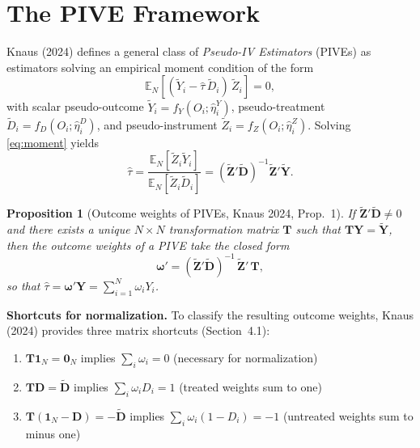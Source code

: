 \documentclass[12pt, a4paper]{article}
\theoremstyle{condstyle}
\theoremstyle{plain}
\newtheorem{proposition}{Proposition}[section]
\newcommand{\EN}{\mathbb{E}_N}
\newcommand{\bone}{\mathbf{1}_N}
\newcommand{\bzero}{\mathbf{0}_N}
\newcommand{\tY}{\tilde{Y}}
\newcommand{\tD}{\tilde{D}}
\newcommand{\tZ}{\tilde{Z}}
\begin{document}
\section{The PIVE Framework}
\label{sec:pive}

Knaus (2024) defines a general class of \emph{Pseudo-IV Estimators} (PIVEs)
as estimators solving an empirical moment condition of the form
\begin{equation}
  \EN\!\left[(\tY_i - \hat\tau\,\tD_i)\,\tZ_i\right] = 0,
  \label{eq:moment}
\end{equation}
with scalar pseudo-outcome $\tY_i = f_Y(O_i;\hat\eta^Y_i)$,
pseudo-treatment $\tD_i = f_D(O_i;\hat\eta^D_i)$,
and pseudo-instrument $\tZ_i = f_Z(O_i;\hat\eta^Z_i)$.
Solving \eqref{eq:moment} yields
\begin{equation}
  \hat\tau = \frac{\EN[\tZ_i\tY_i]}{\EN[\tZ_i\tD_i]}
            = (\tilde{\mathbf{Z}}'\tilde{\mathbf{D}})^{-1}\tilde{\mathbf{Z}}'\tilde{\mathbf{Y}}.
  \label{eq:pive_sol}
\end{equation}

\begin{proposition}[Outcome weights of PIVEs, Knaus 2024, Prop.~1]
\label{prop:weights}
If $\tilde{\mathbf{Z}}'\tilde{\mathbf{D}} \neq 0$ and there exists a unique $N\times N$
transformation matrix $\mathbf{T}$ such that $\mathbf{T}\mathbf{Y} = \tilde{\mathbf{Y}}$,
then the outcome weights of a PIVE take the closed form
\begin{equation}
  \boldsymbol{\omega}' = (\tilde{\mathbf{Z}}'\tilde{\mathbf{D}})^{-1}\,\tilde{\mathbf{Z}}'\,\mathbf{T},
  \label{eq:weights_general}
\end{equation}
so that $\hat\tau = \boldsymbol{\omega}'\mathbf{Y} = \sum_{i=1}^N \omega_i Y_i$.
\end{proposition}

\medskip
\noindent\textbf{Shortcuts for normalization.}
To classify the resulting outcome weights,
Knaus (2024) provides three matrix shortcuts (Section~4.1):

\begin{enumerate}[label=\textbf{SC\arabic*.}]
  \item $\mathbf{T}\bone = \bzero$ implies $\sum_i \omega_i = 0$
        \hfill(necessary for normalization)
  \item $\mathbf{T}\mathbf{D} = \tilde{\mathbf{D}}$ implies $\sum_i \omega_i D_i = 1$
        \hfill(treated weights sum to one)
  \item $\mathbf{T}(\bone - \mathbf{D}) = -\tilde{\mathbf{D}}$ implies $\sum_i \omega_i(1-D_i) = -1$
        \hfill(untreated weights sum to minus one)
\end{enumerate}
\end{document}
